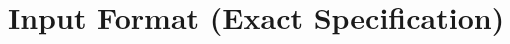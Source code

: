 \documentclass[12pt]{article}
\begin{document}









\section*{Input Format (Exact Specification)}
\end{document}
